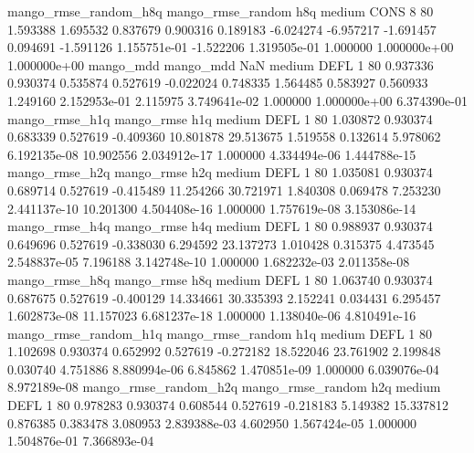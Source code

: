 mango_rmse_random_h8q mango_rmse_random                  h8q     medium     CONS                 8 80  1.593388       1.695532 0.837679       0.900316    0.189183     -6.024274     -6.957217    -1.691457       0.094691 -1.591126 1.155751e-01    -1.522206   1.319505e-01            1.000000    1.000000e+00        1.000000e+00
            mango_mdd         mango_mdd                  NaN     medium     DEFL                 1 80  0.937336       0.930374 0.535874       0.527619   -0.022024      0.748335      1.564485     0.583927       0.560933  1.249160 2.152953e-01     2.115975   3.749641e-02            1.000000    1.000000e+00        6.374390e-01
       mango_rmse_h1q        mango_rmse                  h1q     medium     DEFL                 1 80  1.030872       0.930374 0.683339       0.527619   -0.409360     10.801878     29.513675     1.519558       0.132614  5.978062 6.192135e-08    10.902556   2.034912e-17            1.000000    4.334494e-06        1.444788e-15
       mango_rmse_h2q        mango_rmse                  h2q     medium     DEFL                 1 80  1.035081       0.930374 0.689714       0.527619   -0.415489     11.254266     30.721971     1.840308       0.069478  7.253230 2.441137e-10    10.201300   4.504408e-16            1.000000    1.757619e-08        3.153086e-14
       mango_rmse_h4q        mango_rmse                  h4q     medium     DEFL                 1 80  0.988937       0.930374 0.649696       0.527619   -0.338030      6.294592     23.137273     1.010428       0.315375  4.473545 2.548837e-05     7.196188   3.142748e-10            1.000000    1.682232e-03        2.011358e-08
       mango_rmse_h8q        mango_rmse                  h8q     medium     DEFL                 1 80  1.063740       0.930374 0.687675       0.527619   -0.400129     14.334661     30.335393     2.152241       0.034431  6.295457 1.602873e-08    11.157023   6.681237e-18            1.000000    1.138040e-06        4.810491e-16
mango_rmse_random_h1q mango_rmse_random                  h1q     medium     DEFL                 1 80  1.102698       0.930374 0.652992       0.527619   -0.272182     18.522046     23.761902     2.199848       0.030740  4.751886 8.880994e-06     6.845862   1.470851e-09            1.000000    6.039076e-04        8.972189e-08
mango_rmse_random_h2q mango_rmse_random                  h2q     medium     DEFL                 1 80  0.978283       0.930374 0.608544       0.527619   -0.218183      5.149382     15.337812     0.876385       0.383478  3.080953 2.839388e-03     4.602950   1.567424e-05            1.000000    1.504876e-01        7.366893e-04
